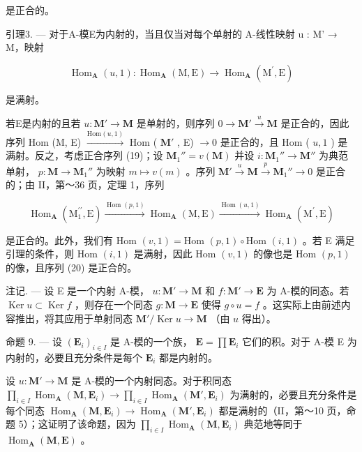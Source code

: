 是正合的。

引理3. --- 对于A-模E为内射的，当且仅当对每个单射的 A-线性映射 u : M' → M，映射

\[
\operatorname{Hom} _ {\mathbf {A}} (u, 1): \operatorname{Hom} _ {\mathbf {A}} (\mathrm{M}, \mathrm{E}) \rightarrow \operatorname{Hom} _ {\mathbf {A}} (\mathrm{M} ^ {\prime}, \mathrm{E})
\]

是满射。

若E是内射的且若 \(u: \mathbf{M}' \to \mathbf{M}\) 是单射的，则序列 \(0 \to \mathbf{M}' \xrightarrow{u} \mathbf{M}\) 是正合的，因此序列 Hom (M, E) \(\xrightarrow{\text{Hom}(u,1)}\) Hom ( \(\mathbf{M}'\) , E) \(\to 0\) 是正合的，且 Hom ( \(u,1\) ) 是满射。反之，考虑正合序列 (19)；设 \(\mathbf{M}_{1}'' = v(\mathbf{M})\) 并设 \(i: \mathbf{M}_{1}'' \to \mathbf{M}''\) 为典范单射， \(p: \mathbf{M} \to \mathbf{M}_{1}''\) 为映射 \(m \mapsto v(m)\) 。序列 \(\mathbf{M}' \xrightarrow{u} \mathbf{M} \xrightarrow{p} \mathbf{M}_{1}'' \to 0\) 是正合的；由 II，第～36 页，定理 1，序列

\[
\operatorname{Hom} _ {\mathbf {A}} \left(\mathrm{M} _ {1} ^ {\prime \prime}, \mathrm{E}\right) \xrightarrow {\operatorname{Hom} (p , 1)} \operatorname{Hom} _ {\mathbf {A}} (\mathrm{M}, \mathrm{E}) \xrightarrow {\operatorname{Hom} (u , 1)} \operatorname{Hom} _ {\mathbf {A}} \left(\mathrm{M} ^ {\prime}, \mathrm{E}\right)
\]

是正合的。此外，我们有 Hom \((v, 1) = \text{Hom } (p, 1) \circ \text{Hom } (i, 1)\) 。若 E 满足引理的条件，则 Hom \((i, 1)\) 是满射，因此 Hom \((v, 1)\) 的像也是 Hom \((p, 1)\) 的像，且序列 (20) 是正合的。

注记. --- 设 E 是一个内射 A-模， \(u: \mathbf{M}' \to \mathbf{M}\) 和 \(f: \mathbf{M}' \to \mathbf{E}\) 为 A-模的同态。若 \(\operatorname{Ker} u \subset \operatorname{Ker} f\) ，则存在一个同态 \(g: \mathbf{M} \to \mathbf{E}\) 使得 \(g \circ u = f\) 。这实际上由前述内容推出，将其应用于单射同态 \(\mathbf{M}' / \operatorname{Ker} u \to \mathbf{M}\) （由 \(u\) 得出）。

命题 9. --- 设 \((\mathbf{E}_i)_{i\in I}\) 是 A-模的一个族， \(\mathbf{E} = \prod \mathbf{E}_i\) 它们的积。对于 A-模 E 为内射的，必要且充分条件是每个 \(\mathbf{E}_i\) 都是内射的。

设 \(u: \mathbf{M}' \to \mathbf{M}\) 是 A-模的一个内射同态。对于积同态 \(\prod_{i \in I} \operatorname{Hom}_{\mathbf{A}}(\mathbf{M}, \mathbf{E}_i) \to \prod_{i \in I} \operatorname{Hom}_{\mathbf{A}}(\mathbf{M}', \mathbf{E}_i)\) 为满射的，必要且充分条件是每个同态 \(\operatorname{Hom}_{\mathbf{A}}(\mathbf{M}, \mathbf{E}_i) \to \operatorname{Hom}_{\mathbf{A}}(\mathbf{M}', \mathbf{E}_i)\) 都是满射的（II，第～10 页，命题 5）；这证明了该命题，因为 \(\prod_{i \in I} \operatorname{Hom}_{\mathbf{A}}(\mathbf{M}, \mathbf{E}_i)\) 典范地等同于 \(\operatorname{Hom}_{\mathbf{A}}(\mathbf{M}, \mathbf{E})\) 。

